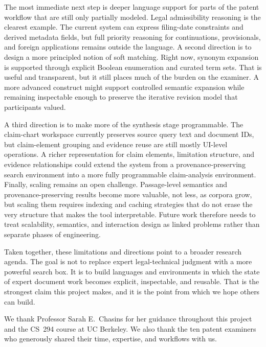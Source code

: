 \documentclass[sigconf]{acmart}
\begin{document}
The most immediate next step is deeper language support for parts of the patent
workflow that are still only partially modeled. Legal admissibility reasoning is
the clearest example. The current system can express filing-date constraints and
derived metadata fields, but full priority reasoning for continuations,
provisionals, and foreign applications remains outside the language. A second
direction is to design a more principled notion of soft matching. Right now,
synonym expansion is supported through explicit Boolean enumeration and curated
term sets. That is useful and transparent, but it still places much of the
burden on the examiner. A more advanced construct might support controlled
semantic expansion while remaining inspectable enough to preserve the iterative
revision model that participants valued.

A third direction is to make more of the synthesis stage programmable. The
claim-chart workspace currently preserves source query text and document IDs,
but claim-element grouping and evidence reuse are still mostly UI-level
operations. A richer representation for claim elements, limitation structure,
and evidence relationships could extend the system from a provenance-preserving
search environment into a more fully programmable claim-analysis environment.
Finally, scaling remains an open challenge. Passage-level semantics and
provenance-preserving results become more valuable, not less, as corpora grow,
but scaling them requires indexing and caching strategies that do not erase the
very structure that makes the tool interpretable. Future work therefore needs
to treat scalability, semantics, and interaction design as linked problems
rather than separate phases of engineering.

Taken together, these limitations and directions point to a broader research
agenda. The goal is not to replace expert legal-technical judgment with a more
powerful search box. It is to build languages and environments in which the
state of expert document work becomes explicit, inspectable, and reusable. That
is the strongest claim this project makes, and it is the point from which we
hope others can build.


\begin{acks}
We thank Professor Sarah E.\ Chasins for her guidance throughout this
project and the CS~294 course at UC Berkeley. We also thank the ten patent
examiners who generously shared their time, expertise, and workflows with us.
\end{acks}
\end{document}
